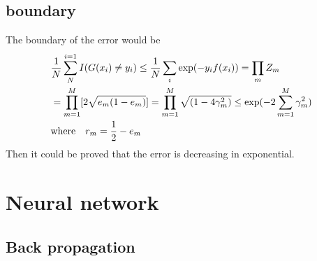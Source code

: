 \documentclass[12pt,a4paper]{article}
\begin{document}
\subsection*{boundary}
The boundary of the error would be 
\begin{eqnarray*}
&\frac{1}{N}\sum_{N}^{i=1}I(G(x_i)\neq y_i)\le\frac{1}{N}\sum_{i}\exp(-y_if(x_i))=\prod_{m}Z_m \\&= \prod_{m=1}^{M}[2\sqrt{e_m(1-e_m)}] = \prod_{m=1}^{M}\sqrt{(1-4\gamma_m^2)} \le \exp(-2\sum_{m=1}^{M}\gamma_m^2) \\
&{\rm where} \quad r_m = \frac{1}{2}-e_m
\end{eqnarray*}
Then it could be proved that the error is decreasing in exponential.
\section*{Neural network}
\subsection*{Back propagation}
\end{document}
